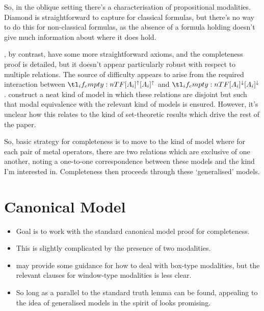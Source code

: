 \documentclass[10pt]{article}
\makeatletter
\renewcommand\lbrack[1][]{\ooalign{\ensuremath{#1\lfloor}\cr\ensuremath{#1\lceil}}}
\renewcommand\rbrack[1][]{\ooalign{\ensuremath{#1\rfloor}\cr\ensuremath{#1\rceil}}}
\newcommand{\llbrack}[1][]{\savebox{\@bry}{\(\m@th{#1\lbrack}\)}%
  \mathopen{\usebox{\@bry}\kern-0.7\wd\@bry\usebox{\@bry}}}
\newcommand{\rrbrack}[1][]{\savebox{\@bry}{\(\m@th{#1\rbrack}\)}%
  \mathclose{\usebox{\@bry}\kern-0.7\wd\@bry\usebox{\@bry}}}
\newcommand{\sem}[1]{\ensuremath{\llbrack{#1}\rrbrack}}
\makeatother
\begin{document}
So, in the oblique setting there's a characterisation of propositional modalities.
Diamond is straightforward to capture for classical formulas, but there's no way to do this for non-classical formulas, as the absence of a formula holding doesn't give much information about where it does hold.

\citeauthor{Gargov:1987aa}, by contrast, have some more straightforward axioms, and the completeness proof is detailed, but it doesn't appear particularly robust with respect to multiple relations.
The source of difficulty appears to arise from the required interaction between \(\lattu{}\) and \(\lattd{}\).
\citeauthor{Gargov:1987aa} construct a neat kind of model in which these relations are disjoint but such that modal equivalence with the relevant kind of models is ensured.
However, it's unclear how this relates to the kind of set-theoretic results which drive the rest of the paper.


So, basic strategy for completeness is to move to the kind of model where for each pair of metal operators, there are two relations which are exclusive of one another, noting a one-to-one correspondence between these models and the kind I'm interested in.
Completeness then proceeds through these `generalised' models.



\section{Canonical Model}
\label{sec:canonical-model}

\begin{itemize}
\item Goal is to work with the standard canonical model proof for completeness.
\item This is slightly complicated by the presence of two modalities.
\item \citeauthor{Hoek:1996aa} may provide some guidance for how to deal with box-type modalities, but the relevant clauses for window-type modalities is less clear.
\item So long as a parallel to the standard truth lemma can be found, appealing to the idea of generalised models in the spirit of \citeauthor{Gargov:1987aa} looks promising.
\end{itemize}
\end{document}
